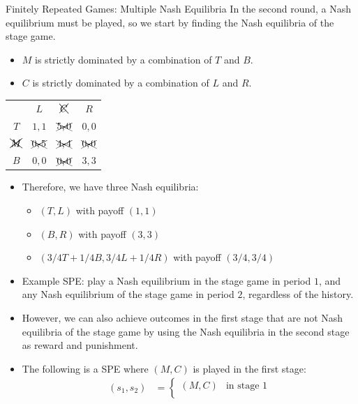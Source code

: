 \documentclass[10pt]{extarticle}
\begin{document}
\begin{problem}{Finitely Repeated Games: Multiple Nash Equilibria}
    In the second round, a Nash equilibrium must be played, so we start by finding the Nash equilibria of the stage game.
    \begin{itemize}
      \item $M$ is strictly dominated by a combination of $T$ and $B$.
      \item $C$ is strictly dominated by a combination of $L$ and $R$.
    \end{itemize}
    \begin{center}
      \renewcommand{\arraystretch}{1.5}
      \begin{tabular}{c|c|c|c|}
        \multicolumn{1}{c}{} & \multicolumn{1}{c}{$L$}& \multicolumn{1}{c}{$\xcancel{C}$}& \multicolumn{1}{c}{$R$}\\
        \cline{2-4}
        $T$ & $1,1$ & $\xcancel{5,0}$ & $0,0$\\
        \cline{2-4}
        $\xcancel{M}$ & $\xcancel{0,5}$ & $\xcancel{4,4}$ & $\xcancel{0,0}$\\
        \cline{2-4}
        $B$ & $0,0$ & $\xcancel{0,0}$ & $3,3$\\
        \cline{2-4}
      \end{tabular}
    \end{center}
    \begin{itemize}
      \item Therefore, we have three Nash equilibria:
        \begin{itemize}
          \item $(T,L)$ with payoff $(1,1)$
          \item $(B,R)$ with payoff $(3,3)$
          \item $(3/4T + 1/4B,3/4L + 1/4R)$ with payoff $(3/4,3/4)$
        \end{itemize}
      \item Example SPE: play a Nash equilibrium in the stage game in period $1$, and any Nash equilibrium of the stage game in period $2$, regardless of the history.
      \item However, we can also achieve outcomes in the first stage that are not Nash equilibria of the stage game by using the Nash equilibria in the second stage as reward and punishment.
      \item The following is a SPE where $(M,C)$ is played in the first stage:
        \begin{align*}
          (s_1,s_2) &= \begin{cases}
            (M,C) & \text{in stage 1}\\

\end{cases}
\end{align*}
\end{itemize}
\end{problem}
\end{document}
